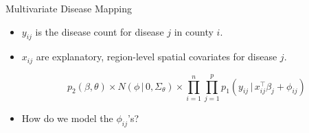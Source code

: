 \documentclass[10pt]{beamer}
\newcommand{\given}{\, | \,}
\begin{document}
\begin{frame}{Multivariate Disease Mapping}
 
\begin{itemize}\setlength{\itemsep}{0.5cm}

\item $y_{ij}$ is the disease count for disease $j$ in county $i$.

\item $x_{ij}$ are explanatory, region-level spatial covariates for disease $j$.



\begin{block}{}
\[
p_2(\beta,\theta) \times N(\phi \given 0, \Sigma_{\theta}) \times \prod_{i=1}^n\prod_{j=1}^p p_1(y_{ij}\given x_{ij}^{\top}\beta_j + \phi_{ij})
\]
\end{block}

\item How do we model the $\phi_{ij}$'s?

\end{itemize}

\end{frame}
\end{document}
